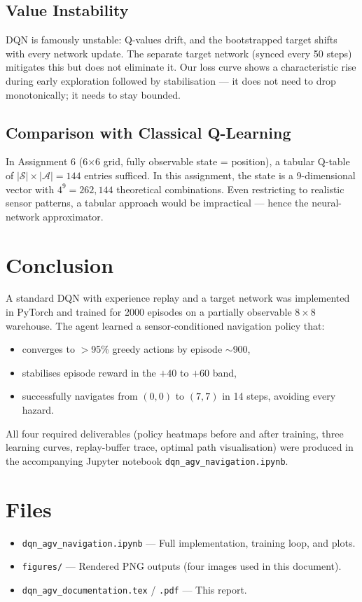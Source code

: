 \documentclass[11pt]{article}
\begin{document}
\subsection{Value Instability}
DQN is famously unstable: Q-values drift, and the bootstrapped target shifts with every network update. The separate target network (synced every 50 steps) mitigates this but does not eliminate it. Our loss curve shows a characteristic rise during early exploration followed by stabilisation --- it does not need to drop monotonically; it needs to stay bounded.

\subsection{Comparison with Classical Q-Learning}
In Assignment 6 (6$\times$6 grid, fully observable state = position), a tabular Q-table of $|\mathcal{S}| \times |\mathcal{A}| = 144$ entries sufficed. In this assignment, the state is a 9-dimensional vector with $4^9 = 262{,}144$ theoretical combinations. Even restricting to realistic sensor patterns, a tabular approach would be impractical --- hence the neural-network approximator.

\section{Conclusion}

A standard DQN with experience replay and a target network was implemented in PyTorch and trained for 2000 episodes on a partially observable $8\times 8$ warehouse. The agent learned a sensor-conditioned navigation policy that:
\begin{itemize}[nosep]
\item converges to $>$95\% greedy actions by episode $\sim$900,
\item stabilises episode reward in the $+40$ to $+60$ band,
\item successfully navigates from $(0,0)$ to $(7,7)$ in 14 steps, avoiding every hazard.
\end{itemize}
All four required deliverables (policy heatmaps before and after training, three learning curves, replay-buffer trace, optimal path visualisation) were produced in the accompanying Jupyter notebook \texttt{dqn\_agv\_navigation.ipynb}.

\section*{Files}

\begin{itemize}[nosep]
\item \texttt{dqn\_agv\_navigation.ipynb} --- Full implementation, training loop, and plots.
\item \texttt{figures/} --- Rendered PNG outputs (four images used in this document).
\item \texttt{dqn\_agv\_documentation.tex} / \texttt{.pdf} --- This report.
\end{itemize}
\end{document}
